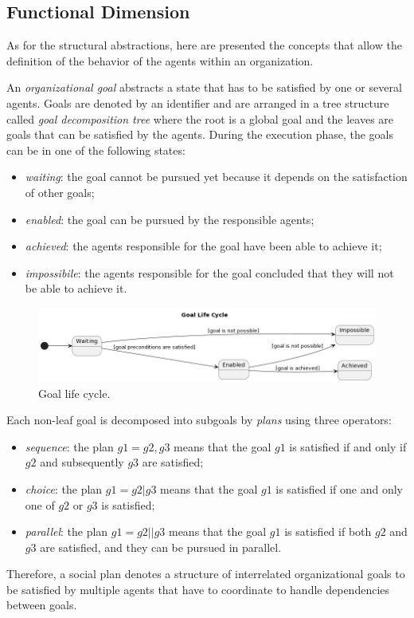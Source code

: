 \subsection{Functional Dimension}
As for the structural abstractions, here are presented the concepts that allow the definition of the behavior of the agents within an organization.

An \textit{organizational goal} abstracts a state that has to be satisfied by one or several agents.
Goals are denoted by an identifier and are arranged in a tree structure called \textit{goal decomposition tree} where the root is a global goal and the leaves are goals that can be satisfied by the agents.
During the execution phase, the goals can be in one of the following states:
\begin{itemize}
    \item \textit{waiting}: the goal cannot be pursued yet because it depends on the satisfaction of other goals;
    \item \textit{enabled}: the goal can be pursued by the responsible agents;
    \item \textit{achieved}: the agents responsible for the goal have been able to achieve it;
    \item \textit{impossibile}: the agents responsible for the goal concluded that they will not be able to achieve it.
\end{itemize}

\begin{figure}
    \centering
    \includegraphics[width=\textwidth]{images/goal-life-cycle.png}
    \caption{Goal life cycle.}
    \label{fig:goal-life-cycle}
\end{figure}

Each non-leaf goal is decomposed into subgoals by \textit{plans} using three operators:
\begin{itemize}
    \item \textit{sequence}: the plan $g1 = g2, g3$ means that the goal $g1$ is satisfied if and only if $g2$ and subsequently $g3$ are satisfied;
    \item \textit{choice}: the plan $g1 = g2 | g3$ means that the goal $g1$ is satisfied if one and only one of $g2$ or $g3$ is satisfied;
    \item \textit{parallel}: the plan $g1 = g2 || g3$ means that the goal $g1$ is satisfied if both $g2$ and $g3$ are satisfied, and they can be pursued in parallel.
\end{itemize}
Therefore, a social plan denotes a structure of interrelated organizational goals to be satisfied by multiple agents that have to coordinate to handle dependencies between goals.


